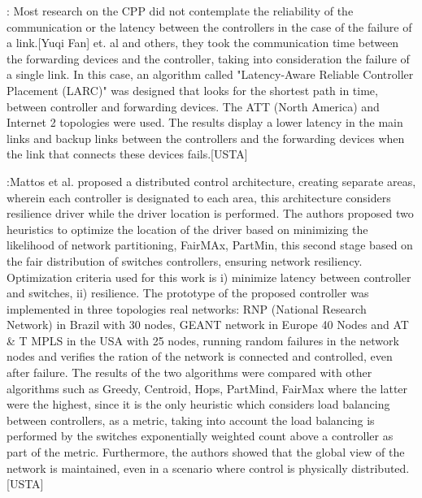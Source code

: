 \documentclass[a4paper,10pt]{article}
\begin{document}



\cite{FaXi18}: Most research on the CPP did not contemplate the reliability of the communication or the latency between the controllers in the case of the failure of a link.[Yuqi Fan] et. al and others, they took the communication time between the forwarding devices and the controller, taking into consideration the failure of a single link.
In this case, an algorithm called "Latency-Aware Reliable Controller Placement (LARC)" was designed that looks for the shortest path in time, between controller and forwarding devices. The ATT (North America) and Internet 2 topologies were used.
The results display a lower latency in the main links and backup links between the controllers and the forwarding devices when the link that connects these devices fails.[USTA]


\cite{MaDu16}:Mattos et al. proposed a distributed control architecture, creating separate areas, wherein each controller is designated to each area, this architecture considers resilience driver while the driver location is performed. The authors proposed two heuristics to optimize the location of the driver based on minimizing the likelihood of network partitioning, FairMAx, PartMin, this second stage based on the fair distribution of switches controllers, ensuring network resiliency. Optimization criteria used for this work is i) minimize latency between controller and switches, ii) resilience. The prototype of the proposed controller was implemented in three topologies real networks: RNP (National Research Network) in Brazil with 30 nodes, GEANT network in Europe 40 Nodes and AT & T MPLS in the USA with 25 nodes, running random failures in the network nodes and verifies the ration of the network is connected and controlled, even after failure. The results of the two algorithms were compared with other algorithms such as Greedy, Centroid, Hops, PartMind, FairMax where the latter were the highest, since it is the only heuristic which considers load balancing between controllers, as a metric, taking into account the load balancing is performed by the switches exponentially weighted count above a controller as part of the metric. Furthermore, the authors showed that the global view of the network is maintained, even in a scenario where control is physically distributed.[USTA]
\end{document}
